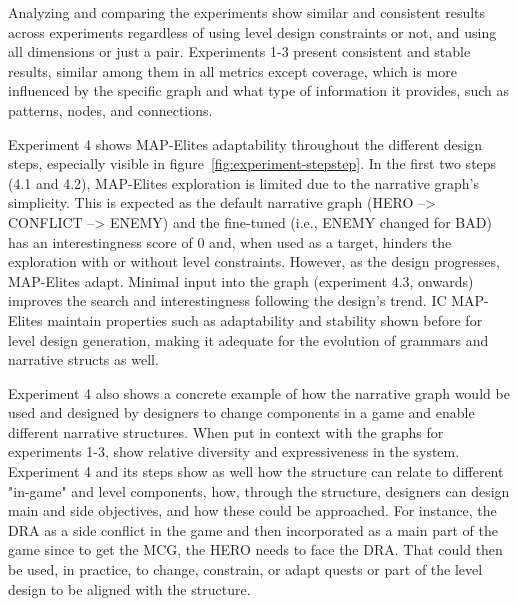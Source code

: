 Analyzing and comparing the experiments show similar and consistent results across experiments regardless of using level design constraints or not, and using all dimensions or just a pair. Experiments 1-3 present consistent and stable results, similar among them in all metrics except coverage, which is more influenced by the specific graph and what type of information it provides, such as patterns, nodes, and connections. 

Experiment 4 shows MAP-Elites adaptability throughout the different design steps, especially visible in figure~\ref{fig:experiment-stepstep}. In the first two steps (4.1 and 4.2), MAP-Elites exploration is limited due to the narrative graph's simplicity. This is expected as the default narrative graph (HERO --> CONFLICT --> ENEMY) and the fine-tuned (i.e., ENEMY changed for BAD) has an interestingness score of 0 and, when used as a target, hinders the exploration with or without level constraints. However, as the design progresses, MAP-Elites adapt. Minimal input into the graph (experiment 4.3, onwards) improves the search and interestingness following the design's trend. IC MAP-Elites maintain properties such as adaptability and stability shown before for level design generation, making it adequate for the evolution of grammars and narrative structs as well. 


Experiment 4 also shows a concrete example of how the narrative graph would be used and designed by designers to change components in a game and enable different narrative structures. When put in context with the graphs for experiments 1-3, show relative diversity and expressiveness in the system. Experiment 4 and its steps show as well how the structure can relate to different "in-game" and level components, how, through the structure, designers can design main and side objectives, and how these could be approached. For instance, the DRA as a side conflict in the game and then incorporated as a main part of the game since to get the MCG, the HERO needs to face the DRA. That could then be used, in practice, to change, constrain, or adapt quests or part of the level design to be aligned with the structure.



